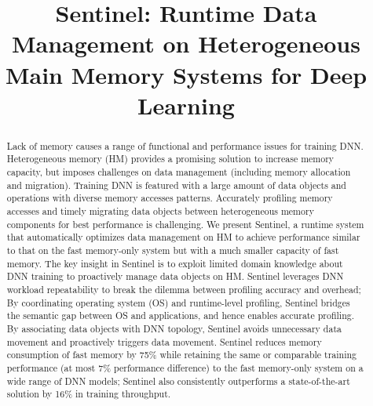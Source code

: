 \documentclass[sigconf,anonymous]{acmart}
\newcommand{\name}{Sentinel\xspace}
\begin{document}

\date{}

\title{\name: Runtime Data Management on Heterogeneous Main Memory Systems for Deep Learning}


\begin{abstract}

Lack of memory causes a range of functional and performance issues for training DNN. Heterogeneous memory (HM) provides a promising solution to increase memory capacity, but imposes challenges on data management (including memory allocation and migration). Training DNN is featured with a large amount of data objects and operations with diverse memory accesses patterns. Accurately profiling memory accesses and timely migrating data objects between heterogeneous memory components for best performance is challenging. We present \name, a runtime system that automatically optimizes data management on HM to achieve performance similar to that on the fast memory-only system but with a much smaller capacity of fast memory. 
\textcolor{dong2}{The key insight in \name is to exploit limited domain knowledge about DNN training to proactively manage data objects on HM.} %
\name leverages DNN workload repeatability to break the dilemma between profiling accuracy and overhead; By coordinating operating system (OS) and runtime-level profiling, \name bridges the semantic gap between OS and applications, and hence enables accurate profiling. By associating data objects with DNN topology, \name avoids unnecessary data movement and proactively triggers data movement. %
\textcolor{dong2}{\name reduces memory consumption of fast memory by 75\% while retaining the same or comparable training performance (at most 7\% performance difference) to the fast memory-only system on a wide range of }DNN models; \name also consistently outperforms a state-of-the-art solution by 16\% \textcolor{dong}{in training throughput}.





\end{abstract}
\end{document}
